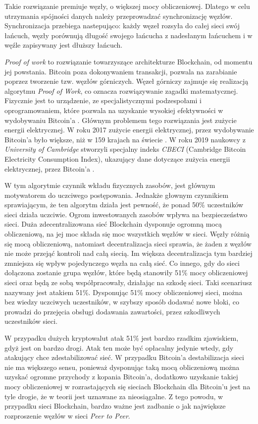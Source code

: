 \documentclass[a4paper,12pt]{book}
\begin{document}
Takie rozwiązanie premiuje węzły, o większej mocy obliczeniowej. Dlatego w celu utrzymania spójności danych należy przeprowadzać synchronizację węzłów. Synchronizacja przebiega nastepująco: każdy węzeł rozsyła do całej sieci swój łańcuch, węzły porównują długość swojego łańcucha z nadesłanym łańcuchem i w węźle zapisywany jest dłuższy łańcuch.

\textit{Proof of work} to rozwiązanie towarzyszące architekturze Blockchain, od momentu jej powstania. Bitcoin poza dokonywaniem transakcji, pozwala na zarabianie poprzez tworzenie tzw. węzłów górniczych. Węzeł górniczy zajmuje się realizacją algorytmu \textit{Proof of Work}, co oznacza rozwiązywanie zagadki matematycznej. Fizycznie jest to urządzenie, ze specjalistycznymi podzespołami i oprogramowaniem, które pozwala na uzyskanie wysokiej efektywności w wydobywaniu Bitcoin'a \cite{nodes}. Głównym problemem tego rozwiązania jest zużycie energii elektrycznej. W roku 2017 zużycie energii elektrycznej, przez wydobywanie Bitcoin'a było większe, niż w 159 krajach na świecie \cite{elctricity-bitcoin}. W roku 2019 naukowcy z \textit{University of Cambridge} stworzyli specjalny indeks \textit{CBECI} (Cambridge Bitcoin Electricity Consumption Index), ukazujący dane dotyczące zużycia energii elektrycznej, przez Bitcoin'a \cite{CBECI}.

W tym algorytmie czynnik wkładu fizycznych zasobów, jest głównym motywatorem do uczciwego postępowania. Jednakże głownym czynnikiem sprawiającym, że ten algorytm działa jest pewność, że ponad 50\% uczestników sieci działa uczciwie. Ogrom inwestowanych zasobów wpływa na bezpieczeństwo sieci. Duża zdecentralizowana sieć Blockchain dysponuje ogromną mocą obliczeniową, na jej moc składa się moc wszystkich węzłów w sieci. Węzły różnią się mocą obliczeniową, natomiast decentralizacja sieci sprawia, że żaden z węzłów nie może przejąć kontroli nad całą siecią. Im większa decentralizacja tym bardziej zmniejsza się wpływ pojedynczego węzła na całą sieć. Co innego, gdy do sieci dołączona zostanie grupa węzłów, które będą stanowiły 51\% mocy obliczeniowej sieci oraz będą ze sobą współpracowały, działając na szkodę sieci. Taki scenariusz nazywany jest atakiem 51\%. Dysponując 51\% mocy obliczeniowej sieci, można bez wiedzy uczciwych uczestników, w szybszy sposób dodawać nowe bloki, co prowadzi do przejęcia obsługi dodawania zawartości, przez szkodliwych uczestników sieci\cite{atack51}.

W przypadku dużych kryptowalut atak 51\% jest bardzo rzadkim zjawiskiem, gdyż jest on bardzo drogi. Atak ten może być opłacalny jedynie wtedy, gdy atakujący chce zdestabilizować sieć. W przypadku Bitcoin'a destabilizacja sieci nie ma większego sensu, ponieważ dysponując taką mocą obliczeniową można uzyskać ogromne przychody z kopania Bitcoin'a, dodatkowo uzyskanie takiej mocy obliczeniowej w rozrastających się sieciach Blockchain dla Bitcoin'u jest na tyle drogie, że w teorii jest uznawane za nieosiągalne. Z tego powodu, w przypadku sieci Blockchain, bardzo ważne jest zadbanie o jak największe rozproszenie węzłów w sieci \textit{Peer to Peer}\cite{abpow}.
\end{document}
